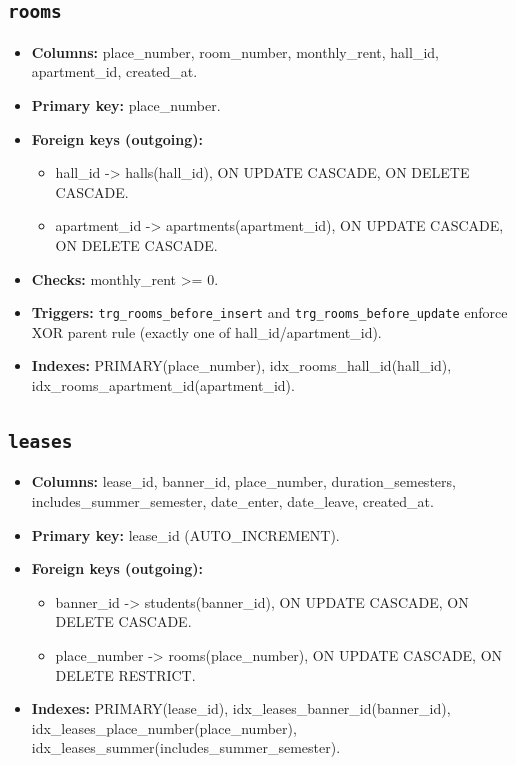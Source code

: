 \documentclass[11pt,a4paper]{article}
\begin{document}
\subsection{\texttt{rooms}}
\begin{itemize}
  \item \textbf{Columns:} place\_number, room\_number, monthly\_rent, hall\_id, apartment\_id, created\_at.
  \item \textbf{Primary key:} place\_number.
  \item \textbf{Foreign keys (outgoing):}
  \begin{itemize}
    \item hall\_id -> halls(hall\_id), ON UPDATE CASCADE, ON DELETE CASCADE.
    \item apartment\_id -> apartments(apartment\_id), ON UPDATE CASCADE, ON DELETE CASCADE.
  \end{itemize}
  \item \textbf{Checks:} monthly\_rent >= 0.
  \item \textbf{Triggers:} \texttt{trg\_rooms\_before\_insert} and \texttt{trg\_rooms\_before\_update} enforce XOR parent rule (exactly one of hall\_id/apartment\_id).
  \item \textbf{Indexes:} PRIMARY(place\_number), idx\_rooms\_hall\_id(hall\_id), idx\_rooms\_apartment\_id(apartment\_id).
\end{itemize}

\subsection{\texttt{leases}}
\begin{itemize}
  \item \textbf{Columns:} lease\_id, banner\_id, place\_number, duration\_semesters, includes\_summer\_semester, date\_enter, date\_leave, created\_at.
  \item \textbf{Primary key:} lease\_id (AUTO\_INCREMENT).
  \item \textbf{Foreign keys (outgoing):}
  \begin{itemize}
    \item banner\_id -> students(banner\_id), ON UPDATE CASCADE, ON DELETE CASCADE.
    \item place\_number -> rooms(place\_number), ON UPDATE CASCADE, ON DELETE RESTRICT.
  \end{itemize}
  \item \textbf{Indexes:} PRIMARY(lease\_id), idx\_leases\_banner\_id(banner\_id), idx\_leases\_place\_number(place\_number), idx\_leases\_summer(includes\_summer\_semester).
\end{itemize}
\end{document}
